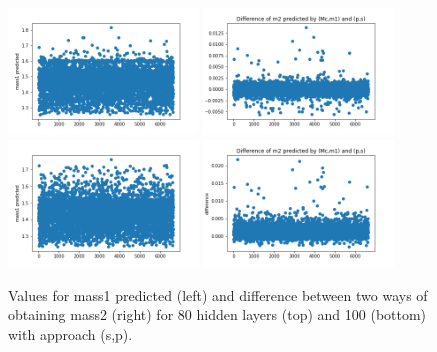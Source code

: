 \documentclass[prd,aps,twocolumn,a4paper,showkeys,nofootinbib]{article}
\begin{document}
\begin{figure}[]
  \center
  \includegraphics[width=0.45\textwidth]{./Figs/80_m1_rec}
  \includegraphics[width=0.45\textwidth]{./Figs/80_m2_dif}
  \includegraphics[width=0.45\textwidth]{./Figs/100_m1_rec}
  \includegraphics[width=0.45\textwidth]{./Figs/100_m2_dif}
  \caption{\label{fig:approach3_comparison2} Values for mass1 predicted (left) and difference between two ways of obtaining mass2 (right) for 80 hidden layers (top) and 100 (bottom) with approach (s,p).}
\end{figure}
\end{document}
